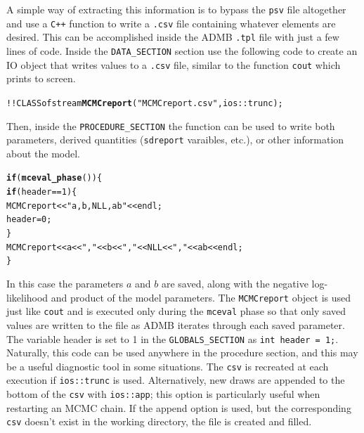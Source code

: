 \documentclass{article}\usepackage[]{graphicx}\usepackage[]{color}
\makeatletter
\newcommand{\hlstr}[1]{\textcolor[rgb]{0.192,0.494,0.8}{#1}}%
\newcommand{\hlkwd}[1]{\textcolor[rgb]{0.737,0.353,0.396}{\textbf{#1}}}%
\newenvironment{kframe}{%
 \def\at@end@of@kframe{}%
 \ifinner\ifhmode%
  \def\at@end@of@kframe{\end{minipage}}%
  \begin{minipage}{\columnwidth}%
 \fi\fi%
 \def\FrameCommand##1{\hskip\@totalleftmargin \hskip-\fboxsep
 \colorbox{shadecolor}{##1}\hskip-\fboxsep
     \hskip-\linewidth \hskip-\@totalleftmargin \hskip\columnwidth}%
 \MakeFramed {\advance\hsize-\width
   \@totalleftmargin\z@ \linewidth\hsize
   \@setminipage}}%
 {\par\unskip\endMakeFramed%
 \at@end@of@kframe}
\newenvironment{knitrout}{}{} %
\makeatother
\begin{document}
A simple way of extracting this information is to bypass the
\texttt{psv} file altogether and use a \texttt{C++} function
to write a \texttt{.csv} file containing whatever elements
are desired. This can be accomplished inside the ADMB
\texttt{.tpl} file with just a few lines of code. Inside the
\texttt{DATA\_SECTION} section use the following code to
create an IO object that writes values to a \texttt{.csv}
file, similar to the function \texttt{cout} which prints to
screen.
\begin{knitrout}
\color{fgcolor}\begin{kframe}
\begin{alltt}
  !!CLASS ofstream \hlkwd{MCMCreport}(\hlstr{"MCMCreport.csv"},ios::trunc);
\end{alltt}
\end{kframe}
\end{knitrout}

Then, inside the \texttt{PROCEDURE\_SECTION} the function
can be used to write both parameters, derived quantities 
(\texttt{sdreport} varaibles, etc.), or other information 
about the model.
\begin{knitrout}
\color{fgcolor}\begin{kframe}
\begin{alltt}
  \hlkwd{if}(\hlkwd{mceval_phase}())\{
    \hlkwd{if}(header==1) \{
        MCMCreport << \hlstr{"a,b,NLL,ab"} << endl;
        header=0;
    \}
    MCMCreport << a <<\hlstr{","} << b << \hlstr{","} << NLL << \hlstr{","} << ab << endl;
  \}
\end{alltt}
\end{kframe}
\end{knitrout}


In this case the parameters $a$ and $b$ are saved, along with the negative
log-likelihood and product of the model parameters.  The
\texttt{MCMCreport} object is used just like \texttt{cout} and is executed
only during the \texttt{mceval} phase so that only saved values are written
to the file as ADMB iterates through each saved parameter. The variable
header is set to 1 in the \texttt{GLOBALS\_SECTION} as \texttt{int header =
  1;}. Naturally, this code can be used anywhere in the procedure section,
and this may be a useful diagnostic tool in some situations. The \texttt{csv} 
is recreated at each execution if \texttt{ios::trunc} is used. Alternatively, 
new draws are appended to the bottom of the \texttt{csv} with \texttt{ios::app}; 
this option is particularly useful when restarting an MCMC chain. If the append 
option is used, but the corresponding \texttt{csv} doesn't exist in the working 
directory, the file is created and filled.
\end{document}
